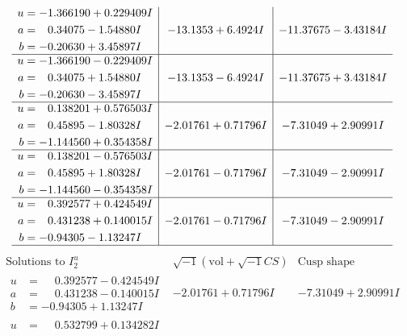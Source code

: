 \documentclass[1p]{elsarticle_modified}
\theoremstyle{definition}
\newcommand{\I}{\sqrt{-1}}
\begin{document}
$$\begin{array}{c|c|c}
\begin{aligned}
u &= -1.366190 + 0.229409 I \\
a &= \phantom{-}0.34075 - 1.54880 I \\
b &= -0.20630 + 3.45897 I\end{aligned}
 & -13.1353 + 6.4924 I & -11.37675 - 3.43184 I \\ \hline\begin{aligned}
u &= -1.366190 - 0.229409 I \\
a &= \phantom{-}0.34075 + 1.54880 I \\
b &= -0.20630 - 3.45897 I\end{aligned}
 & -13.1353 - 6.4924 I & -11.37675 + 3.43184 I \\ \hline\begin{aligned}
u &= \phantom{-}0.138201 + 0.576503 I \\
a &= \phantom{-}0.45895 - 1.80328 I \\
b &= -1.144560 + 0.354358 I\end{aligned}
 & -2.01761 + 0.71796 I & -7.31049 + 2.90991 I \\ \hline\begin{aligned}
u &= \phantom{-}0.138201 - 0.576503 I \\
a &= \phantom{-}0.45895 + 1.80328 I \\
b &= -1.144560 - 0.354358 I\end{aligned}
 & -2.01761 - 0.71796 I & -7.31049 - 2.90991 I \\ \hline\begin{aligned}
u &= \phantom{-}0.392577 + 0.424549 I \\
a &= \phantom{-}0.431238 + 0.140015 I \\
b &= -0.94305 - 1.13247 I\end{aligned}
 & -2.01761 - 0.71796 I & -7.31049 - 2.90991 I\\
 \hline 
 \end{array}$$\newpage$$\begin{array}{c|c|c}  
\text{Solutions to }I^u_{2}& \I (\text{vol} + \sqrt{-1}CS) & \text{Cusp shape}\\
 \hline 
\begin{aligned}
u &= \phantom{-}0.392577 - 0.424549 I \\
a &= \phantom{-}0.431238 - 0.140015 I \\
b &= -0.94305 + 1.13247 I\end{aligned}
 & -2.01761 + 0.71796 I & -7.31049 + 2.90991 I \\ \hline\begin{aligned}
u &= \phantom{-}0.532799 + 0.134282 I \\

\end{aligned}
\end{array}$$
\end{document}

